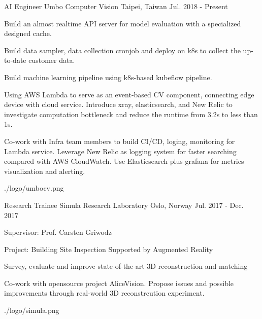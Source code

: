 

\begin{cventries}

  \cventry
    {AI Engineer} %
    {Umbo Computer Vision} %
    {Taipei, Taiwan} %
    {Jul. 2018 - Present} %
    {
      \begin{cvitems} %
        \item {Build an almost realtime API server for model evaluation with a specialized designed cache.}
        \item {Build data sampler, data collection cronjob and deploy on k8s to collect the up-to-date customer data.}
        \item {Build machine learning pipeline using k8s-based kubeflow pipeline.}
        \item {Using AWS Lambda to serve as an event-based CV component, connecting edge device with cloud service. Introduce xray, elasticsearch, and New Relic to investigate computation bottleneck and reduce the runtime from 3.2s to less than 1s.}
        \item {Co-work with Infra team members to build CI/CD, loging, monitoring for Lambda service. Leverage New Relic as logging system for faster searching compared with AWS CloudWatch. Use Elasticsearch plus grafana for metrics visualization and alerting.}
      \end{cvitems}
    }
    {./logo/umbocv.png}

  \cventry
    {Research Trainee} %
    {Simula Research Laboratory} %
    {Oslo, Norway} %
    {Jul. 2017 - Dec. 2017} %
    {
      \begin{cvitems} %
        \item {Supervisor: Prof. Carsten Griwodz}
        \item {Project: Building Site Inspection Supported by Augmented Reality}
        \item {Survey, evaluate and improve state-of-the-art 3D reconstruction and matching}
        \item {Co-work with opensource project AliceVision. Propose issues and possible improvements through real-world 3D reconstrcution experiment.}
      \end{cvitems}
    }
    {./logo/simula.png} %

\end{cventries}
